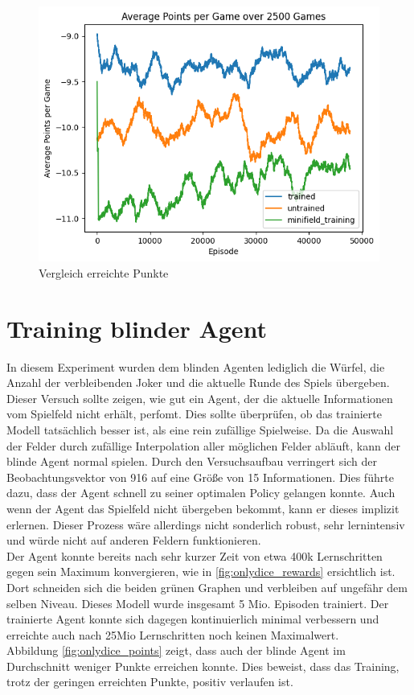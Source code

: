 \begin{figure}[!h]
    \centering
    \includegraphics[scale=0.5]{Bilder/points_minifeld.png}
    \caption{Vergleich erreichte Punkte}
    \label{fig:Minifeld_points}
\end{figure}

\clearpage
\section{Training blinder Agent}
In diesem Experiment wurden dem blinden Agenten lediglich die Würfel, die Anzahl der verbleibenden Joker und die aktuelle Runde des Spiels übergeben.
Dieser Versuch sollte zeigen, wie gut ein Agent, der die aktuelle Informationen vom  Spielfeld nicht erhält, perfomt. Dies sollte überprüfen, ob das trainierte Modell tatsächlich besser ist, als eine rein zufällige Spielweise.
Da die Auswahl der Felder durch zufällige Interpolation aller möglichen Felder abläuft, kann der blinde Agent normal spielen. Durch den Versuchsaufbau verringert sich der Beobachtungsvektor von 916 auf eine Größe von 15 Informationen. Dies führte dazu, dass der Agent schnell zu seiner optimalen Policy gelangen konnte. Auch wenn der Agent das Spielfeld nicht übergeben bekommt, kann er dieses implizit erlernen. Dieser Prozess wäre allerdings nicht sonderlich robust, sehr lernintensiv und würde nicht auf anderen Feldern funktionieren. \\ 
Der Agent konnte bereits nach sehr kurzer Zeit von etwa 400k Lernschritten gegen sein Maximum konvergieren, wie in \ref{fig:onlydice_rewards} ersichtlich ist. Dort schneiden sich die beiden grünen Graphen und verbleiben auf ungefähr dem selben Niveau. Dieses Modell wurde insgesamt 5 Mio. Episoden trainiert. Der trainierte Agent konnte sich dagegen kontinuierlich minimal verbessern und erreichte auch nach 25Mio Lernschritten noch keinen Maximalwert. \\
Abbildung \ref{fig:onlydice_points} zeigt, dass auch der blinde Agent im Durchschnitt weniger Punkte erreichen konnte. Dies beweist, dass das Training, trotz der geringen erreichten Punkte, positiv verlaufen ist.



